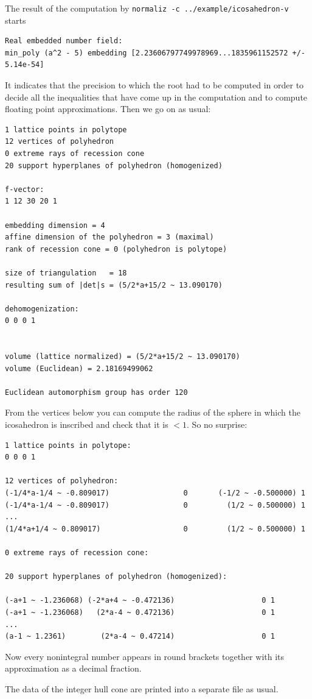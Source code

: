 The result of the computation by \verb|normaliz -c ../example/icosahedron-v| starts
\begin{Verbatim}
Real embedded number field:
min_poly (a^2 - 5) embedding [2.23606797749978969...1835961152572 +/- 5.14e-54]
\end{Verbatim}
It indicates that the precision to which the root had to be computed in order to decide all the inequalities that have come up in the computation and to compute floating point approximations. Then we go on as usual:

\begin{Verbatim}
1 lattice points in polytope
12 vertices of polyhedron
0 extreme rays of recession cone
20 support hyperplanes of polyhedron (homogenized)

f-vector:
1 12 30 20 1 

embedding dimension = 4
affine dimension of the polyhedron = 3 (maximal)
rank of recession cone = 0 (polyhedron is polytope)

size of triangulation   = 18
resulting sum of |det|s = (5/2*a+15/2 ~ 13.090170)

dehomogenization:
0 0 0 1 


volume (lattice normalized) = (5/2*a+15/2 ~ 13.090170)
volume (Euclidean) = 2.18169499062

Euclidean automorphism group has order 120
\end{Verbatim}
From the vertices below you can compute the radius of the sphere in which the icosahedron is inscribed and check that it is $<1$. So no surprise:
\begin{Verbatim}
1 lattice points in polytope:
0 0 0 1

12 vertices of polyhedron:
(-1/4*a-1/4 ~ -0.809017)                 0       (-1/2 ~ -0.500000) 1
(-1/4*a-1/4 ~ -0.809017)                 0         (1/2 ~ 0.500000) 1
...
(1/4*a+1/4 ~ 0.809017)                   0         (1/2 ~ 0.500000) 1

0 extreme rays of recession cone:

20 support hyperplanes of polyhedron (homogenized):

(-a+1 ~ -1.236068) (-2*a+4 ~ -0.472136)                    0 1
(-a+1 ~ -1.236068)   (2*a-4 ~ 0.472136)                    0 1
...
(a-1 ~ 1.2361)        (2*a-4 ~ 0.47214)                    0 1
\end{Verbatim}
Now every nonintegral number appears in round brackets together with its approximation as a decimal fraction.

The data of the integer hull cone are printed into a separate file as usual.

